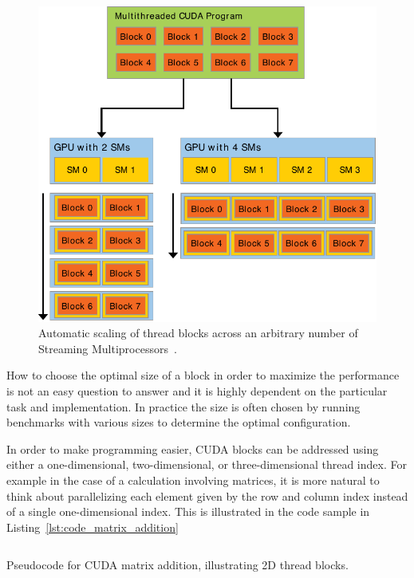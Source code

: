 \begin{figure}[!htbp]
  \centering
  \includegraphics[width=\textwidth]{img/automatic_scaling.pdf}
  \caption[Automatic scaling of blocks across an arbitrary number of Streaming Multiprocessors.]{Automatic scaling of thread blocks across an arbitrary number of Streaming Multiprocessors~\cite{CudaProgrammingGuide}.}
  \label{fig:automatic_scaling}
\end{figure}

How to choose the optimal size of a block in order to maximize the performance is not an easy question to answer and it is highly dependent on the particular task and implementation. In practice the size is often chosen by running benchmarks with various sizes to determine the optimal configuration.

In order to make programming easier, CUDA blocks can be addressed using either a one-dimensional, two-dimensional, or three-dimensional thread index. For example in the case of a calculation involving matrices, it is more natural to think about parallelizing each element given by the row and column index instead of a single one-dimensional index. This is illustrated in the code sample in Listing~\ref{lst:code_matrix_addition}

\begin{listing}[!htbp]
  \centering
  \inputminted[mathescape,
    linenos,
    numbersep=5pt,
    fontsize=\footnotesize,
    frame=lines,
    framesep=2mm]{c}{lst/cuda_matrix_add.lst}
  \caption{Pseudocode for CUDA matrix addition, illustrating 2D thread blocks.}
  \label{lst:code_matrix_addition}
\end{listing}

